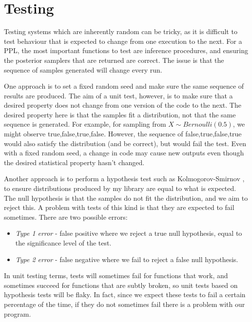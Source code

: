 	
\section{Testing}\label{sec:impl-testing}

Testing systems which are inherently random can be tricky, as it is difficult to test behaviour that is expected to change from one execution to the next. For a PPL, the most important functions to test are inference procedures, and ensuring the posterior samplers that are returned are correct. The issue is that the sequence of samples generated will change every run.

One approach is to set a fixed random seed and make sure the same sequence of results are produced. The aim of a unit test, however, is to make sure that a desired property does not change from one version of the code to the next. The desired property here is that the samples fit a distribution, not that the same sequence is generated. For example, for sampling from $X \sim Bernoulli(0.5)$, we might observe true,false,true,false. However, the sequence of false,true,false,true would also satisfy the distribution (and be correct), but would fail the test. Even with a fixed random seed, a change in code may cause new outputs even though the desired statistical property hasn't changed.

Another approach is to perform a hypothesis test such as Kolmogorov-Smirnov \cite{massey1951kolmogorov}, to ensure distributions produced by my library are equal to what is expected. The null hypothesis is that the samples do not fit the distribution, and we aim to reject this. A problem with tests of this kind is that they are expected to fail sometimes. There are two possible errors:
\begin{itemize}
	\item \textit{Type 1 error} - false positive where we reject a true null hypothesis, equal to the significance level of the test.
	\item \textit{Type 2 error} - false negative where we fail to reject a false null hypothesis.
\end{itemize}
In unit testing terms, tests will sometimes fail for functions that work, and sometimes succeed for functions that are subtly broken, so unit tests based on hypothesis tests will be flaky. In fact, since we expect these tests to fail a certain percentage of the time, if they do not sometimes fail there is a problem with our program.

